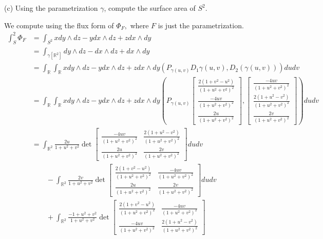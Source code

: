 \documentclass[11pt]{article}
\newcommand{\bbR}{\mathbb{R}}
\begin{document}
\begin{itemize}
\begin{problem}
\item[(c)] Using the parametrization $\gamma$, compute the surface area of $S^2$.
\end{problem}
\begin{solution}
We compute using the flux form of $\Phi_F,$ where $F$ is just the parametrization.
\begin{align*}
    \int_S^2 \Phi_F &=
    \int_{S^2} x dy\wedge dz - y dx\wedge dz + z dx \wedge dy\\ &= \int_{\gamma[\bbR^2]}dy\wedge dz - dx\wedge dz + dx \wedge dy\\
    &= \int_\bbR\int_\bbR x dy\wedge dz - y dx\wedge dz + z dx \wedge dy\left(P_{\gamma(u,v) } D_1\gamma(u,v), D_2(\gamma(u,v))\right)dudv\\
    &= \int_\bbR\int_\bbR xdy\wedge dz - ydx\wedge dz + zdx \wedge dy\left(P_{\gamma(u,v) } \begin{bmatrix}
\frac{2(1 + v^2 - u^2)}{(1 + u^2 + v^2)^2} \\
\frac{-4uv}{(1 + u^2 + v^2)^2} \\
\frac{2u}{(1 + u^2 + v^2)^2}
\end{bmatrix}, 
\begin{bmatrix}
\frac{-4uv}{(1 + u^2 + v^2)^2} \\
\frac{2(1 + u^2 - v^2)}{(1 + u^2 + v^2)^2} \\
\frac{2v}{(1 + u^2 + v^2)^2}
\end{bmatrix}\right)dudv\\
&= \int_{\bbR^2} \frac{2u}{1 + u^2 + v^2}\det 
\begin{bmatrix}
    \frac{-4uv}{(1 + u^2 + v^2)^2} & \frac{2(1 + u^2 - v^2)}{(1 + u^2 + v^2)^2}\\
    \frac{2u}{(1 + u^2 + v^2)^2} & \frac{2v}{(1 + u^2 + v^2)^2}
\end{bmatrix} du dv\\
&\qquad -\int_{\bbR^2} \frac{2v}{1 + u^2 + v^2}\det
\begin{bmatrix}
    \frac{2(1 + v^2 - u^2)}{(1 + u^2 + v^2)^2} & \frac{-4uv}{(1 + u^2 + v^2)^2}\\
    \frac{2u}{(1 + u^2 + v^2)^2} & \frac{2v}{(1 + u^2 + v^2)^2}
\end{bmatrix}du dv\\
 &\qquad + \int_{\bbR^2} \frac{-1 + u^2 + v^2}{1 + u^2 + v^2}\det
 \begin{bmatrix}
     \frac{2(1 + v^2 - u^2)}{(1 + u^2 + v^2)^2} & \frac{-4uv}{(1 + u^2 + v^2)^2}\\
     \frac{-4uv}{(1 + u^2 + v^2)^2} & \frac{2(1 + u^2 - v^2)}{(1 + u^2 + v^2)^2}

\end{bmatrix}
\end{align*}
\end{solution}
\end{itemize}
\end{document}
